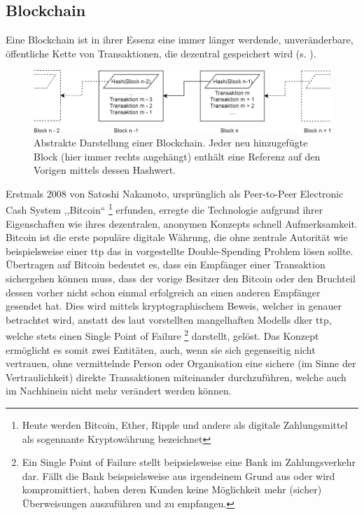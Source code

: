 \subsection{Blockchain}
\label{sec:sota_blockchain}
    Eine Blockchain ist in ihrer Essenz eine immer länger werdende, unveränderbare, öffentliche Kette von Transaktionen, die dezentral gespeichert wird (s. ). 
    \smallskip
    \begin{figure}[H]
    	\centering
    	\includegraphics[width=\textwidth]{graphics/bc_highlvl.png}
    	\caption[Abstrakte Darstellung einer Blockchain]{Abstrakte Darstellung einer Blockchain. Jeder neu hinzugefügte Block (hier immer rechts angehängt) enthält eine Referenz auf den Vorigen mittels dessen Hashwert.}
    	\label{fig:bc_highlvl}
    \end{figure}
    \noindent Erstmals 2008 von Satoshi Nakamoto, ursprünglich als Peer-to-Peer Electronic Cash System ,,Bitcoin``
    \!\footnote{Heute werden Bitcoin, Ether, Ripple und andere als digitale Zahlungsmittel als sogennante Kryptowährung bezeichnet} 
    erfunden, erregte die Technologie aufgrund ihrer Eigenschaften wie ihres dezentralen, anonymen Konzepts schnell Aufmerksamkeit. 
    Bitcoin ist die erste populäre digitale Währung, die ohne zentrale Autorität wie beispielsweise einer \gls{ttp} das in  vorgestellte Double-Spending Problem lösen sollte\cite{Nakamoto2008}. 
    Übertragen auf Bitcoin bedeutet es, dass ein Empfänger einer Transaktion sichergehen können muss, dass der vorige Besitzer den Bitcoin oder den Bruchteil dessen vorher nicht schon einmal erfolgreich an einen anderen Empfänger gesendet hat.
    Dies wird mittels kryptographischem Beweis, welcher in  genauer betrachtet wird, anstatt des laut \citeauthor{Nakamoto2008} vorstellten mangelhaften Modells dker \gls{ttp}, welche stets einen Single Point of Failure
    \!\footnote{Ein Single Point of Failure stellt beipsielsweise eine Bank im Zahlungsverkehr dar.
    Fällt die Bank beispsielsweise aus irgendeinem Grund aus oder wird kompromittiert, haben deren Kunden keine Möglichkeit mehr (sicher) Überweisungen auszuführen und zu empfangen.}
    darstellt, gelöst. 
    Das Konzept ermöglicht es somit zwei Entitäten, auch, wenn sie sich gegenseitig nicht vertrauen, ohne vermittelnde Person oder Organisation eine sichere (im Sinne der Vertraulichkeit) direkte Transaktionen miteinander durchzuführen, welche auch im Nachhinein nicht mehr verändert werden können.\cite{Christidis2016}
    
